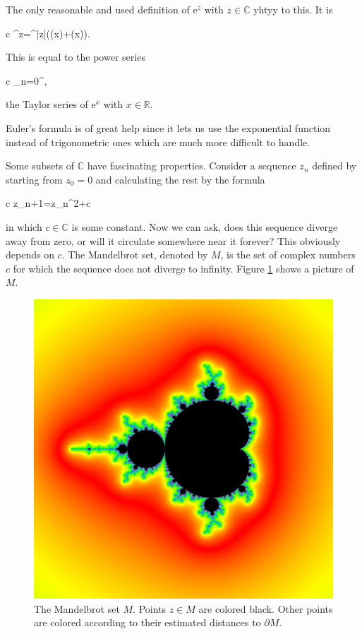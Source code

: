 \documentclass[11pt,oneside,%
]{memoir}
\newenvironment{eqna}{\begin{IEEEeqnarray}{c}}{\end{IEEEeqnarray}\ignorespacesafterend}
\newcommand{\RR}{\mathbb{R}}
\newcommand{\CC}{\mathbb{C}}
\newcommand{\ee}{\mathrm{e}}
\newcommand{\ii}{\mathrm{i}}
\begin{document}
The only reasonable and used definition of \(\ee^{z}\) with \(z\in\CC\) yhtyy to this. It is
\begin{eqna}
    \ee^{z}=\ee^{|z|}(\cos(x)+\ii\sin(x)).
\end{eqna}
This is equal to the power series
\begin{eqna}
    \sum_{n=0}^\infty{},
\end{eqna}
the Taylor series of \(\ee^{x}\) with \(x\in\RR\).

Euler's formula is of great help since it lets us use the exponential function instead of trigonometric ones which are much more difficult to handle.

Some subsets of \(\CC\) have fascinating properties. Consider a sequence \(z_n\) defined by starting from \(z_0=0\) and calculating the rest by the formula
\begin{eqna}
    z_{n+1}=z_n^2+c
\end{eqna}
in which \(c\in\CC\) is some constant. Now we can ask, does this sequence diverge away from zero, or will it circulate somewhere near it forever? This obviously depends on \(c\). The Mandelbrot set, denoted by \(M\), is the set of complex numbers \(c\) for which the sequence does not diverge to infinity. Figure \ref{mandelbrot_picture} shows a picture of \(M\).

\begin{figure}[ht]
    \centering
    \includegraphics[width=\textwidth,trim={230 530 570 530},clip]{graphics/mandelbrot.jpg}
    \caption{The Mandelbrot set \(M\). Points \(z\in M\) are colored black. Other points are colored according to their estimated distances to \(\partial M\).}
    \label{mandelbrot_picture}
\end{figure}
\end{document}
